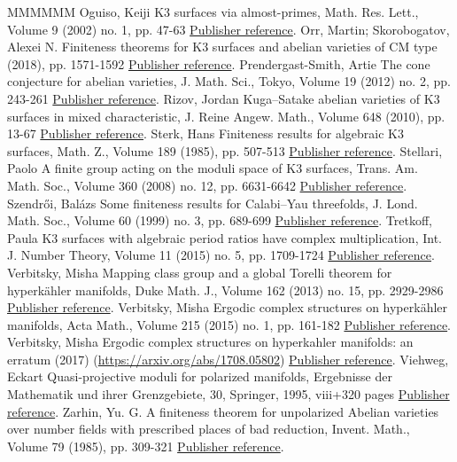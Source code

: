 \documentclass[11pt]{article}
\theoremstyle{definition}
\numberwithin{equation}{section}
\numberwithin{figure}{section}
\numberwithin{table}{section}
\begin{document}
\begin{thebibliography}{MMMMMM}
 Oguiso, Keiji K3 surfaces via almost-primes, Math. Res. Lett., Volume 9 (2002) no. 1, pp. 47-63 \href{https://ahl.centre-mersenne.org/item/AHL_2018__1__227_0/#Og}{Publisher reference}.
 Orr, Martin; Skorobogatov, Alexei N. Finiteness theorems for K3 surfaces and abelian varieties of CM type (2018), pp. 1571-1592 \href{https://ahl.centre-mersenne.org/item/AHL_2018__1__227_0/#OS}{Publisher reference}.
 Prendergast-Smith, Artie The cone conjecture for abelian varieties, J. Math. Sci., Tokyo, Volume 19 (2012) no. 2, pp. 243-261 \href{https://ahl.centre-mersenne.org/item/AHL_2018__1__227_0/#PS}{Publisher reference}.
 Rizov, Jordan Kuga–Satake abelian varieties of K3 surfaces in mixed characteristic, J. Reine Angew. Math., Volume 648 (2010), pp. 13-67 \href{https://ahl.centre-mersenne.org/item/AHL_2018__1__227_0/#Rizov}{Publisher reference}.
 Sterk, Hans Finiteness results for algebraic K3 surfaces, Math. Z., Volume 189 (1985), pp. 507-513 \href{https://ahl.centre-mersenne.org/item/AHL_2018__1__227_0/#Sterk}{Publisher reference}.
 Stellari, Paolo A finite group acting on the moduli space of K3 surfaces, Trans. Am. Math. Soc., Volume 360 (2008) no. 12, pp. 6631-6642 \href{https://ahl.centre-mersenne.org/item/AHL_2018__1__227_0/#Stel}{Publisher reference}.
 Szendrői, Balázs Some finiteness results for Calabi–Yau threefolds, J. Lond. Math. Soc., Volume 60 (1999) no. 3, pp. 689-699 \href{https://ahl.centre-mersenne.org/item/AHL_2018__1__227_0/#Szendroi}{Publisher reference}.
 Tretkoff, Paula K3 surfaces with algebraic period ratios have complex multiplication, Int. J. Number Theory, Volume 11 (2015) no. 5, pp. 1709-1724 \href{https://ahl.centre-mersenne.org/item/AHL_2018__1__227_0/#Tret}{Publisher reference}.
 Verbitsky, Misha Mapping class group and a global Torelli theorem for hyperkähler manifolds, Duke Math. J., Volume 162 (2013) no. 15, pp. 2929-2986 \href{https://ahl.centre-mersenne.org/item/AHL_2018__1__227_0/#Verb}{Publisher reference}.
 Verbitsky, Misha Ergodic complex structures on hyperkähler manifolds, Acta Math., Volume 215 (2015) no. 1, pp. 161-182 \href{https://ahl.centre-mersenne.org/item/AHL_2018__1__227_0/#Verb2}{Publisher reference}.
 Verbitsky, Misha Ergodic complex structures on hyperkahler manifolds: an erratum (2017) (\url{https://arxiv.org/abs/1708.05802}) \href{https://ahl.centre-mersenne.org/item/AHL_2018__1__227_0/#Verb3}{Publisher reference}.
 Viehweg, Eckart Quasi-projective moduli for polarized manifolds, Ergebnisse der Mathematik und ihrer Grenzgebiete, 30, Springer, 1995, viii+320 pages \href{https://ahl.centre-mersenne.org/item/AHL_2018__1__227_0/#Viehweg}{Publisher reference}.
 Zarhin, Yu. G. A finiteness theorem for unpolarized Abelian varieties over number fields with prescribed places of bad reduction, Invent. Math., Volume 79 (1985), pp. 309-321 \href{https://ahl.centre-mersenne.org/item/AHL_2018__1__227_0/#Zarhin}{Publisher reference}.
\end{thebibliography}
\end{document}
